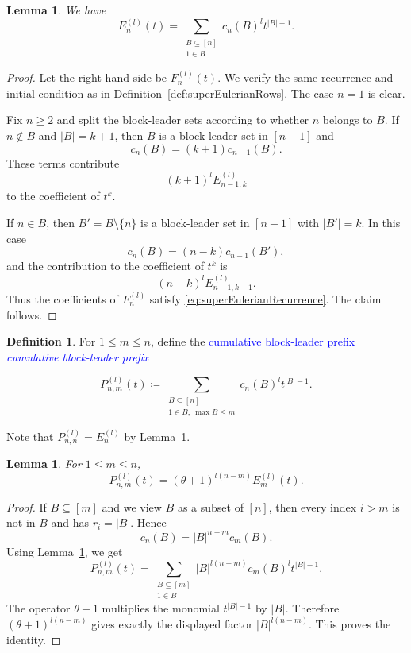 \documentclass[reqno]{amsart}
\numberwithin{equation}{section}
\newtheorem{lemma}[theorem]{Lemma}
\theoremstyle{definition}
\newtheorem{definition}[theorem]{Definition}
\newcommand{\defin}[1]{%
\relax\ifmmode%
\textcolor{blue}{#1}%
\else\textcolor{blue}{\emph{#1}}%
\fi%
}
\begin{document}
\begin{lemma}
\label{lem:blockLeaderFormula}
We have
\[
  E_n^{(l)}(t)
  =
  \sum_{\substack{B\subseteq[n]\\1\in B}}
  c_n(B)^l t^{|B|-1}.
\]
\end{lemma}

\begin{proof}
Let the right-hand side be $F_n^{(l)}(t)$.  We verify the same recurrence and
initial condition as in Definition~\ref{def:superEulerianRows}.  The case
$n=1$ is clear.

Fix $n\geq 2$ and split the block-leader sets according to whether $n$ belongs
to $B$.  If $n\notin B$ and $|B|=k+1$, then $B$ is a block-leader set in
$[n-1]$ and
\[
  c_n(B)=(k+1)c_{n-1}(B).
\]
These terms contribute
\[
  (k+1)^l E_{n-1,k}^{(l)}
\]
to the coefficient of $t^k$.

If $n\in B$, then $B'=B\setminus\{n\}$ is a block-leader set in $[n-1]$ with
$|B'|=k$.  In this case
\[
  c_n(B)=(n-k)c_{n-1}(B'),
\]
and the contribution to the coefficient of $t^k$ is
\[
  (n-k)^lE_{n-1,k-1}^{(l)}.
\]
Thus the coefficients of $F_n^{(l)}$ satisfy
\eqref{eq:superEulerianRecurrence}.  The claim follows.
\end{proof}

\begin{definition}
\label{def:prefixes}
For $1\leq m\leq n$, define the \defin{cumulative block-leader prefix}
\[
  P_{n,m}^{(l)}(t)
  \coloneqq
  \sum_{\substack{B\subseteq[n]\\1\in B,\ \max B\leq m}}
  c_n(B)^l t^{|B|-1}.
\]
\end{definition}

Note that $P_{n,n}^{(l)}=E_n^{(l)}$ by Lemma~\ref{lem:blockLeaderFormula}.

\begin{lemma}
\label{lem:prefixClosedForm}
For $1\leq m\leq n$,
\[
  P_{n,m}^{(l)}(t)
  =
  (\theta+1)^{l(n-m)}E_m^{(l)}(t).
\]
\end{lemma}

\begin{proof}
If $B\subseteq[m]$ and we view $B$ as a subset of $[n]$, then every index
$i>m$ is not in $B$ and has $r_i=|B|$.  Hence
\[
  c_n(B)=|B|^{n-m}c_m(B).
\]
Using Lemma~\ref{lem:blockLeaderFormula}, we get
\[
  P_{n,m}^{(l)}(t)
  =
  \sum_{\substack{B\subseteq[m]\\1\in B}}
  |B|^{l(n-m)}c_m(B)^l t^{|B|-1}.
\]
The operator $\theta+1$ multiplies the monomial $t^{|B|-1}$ by $|B|$.
Therefore $(\theta+1)^{l(n-m)}$ gives exactly the displayed factor
$|B|^{l(n-m)}$.  This proves the identity.
\end{proof}
\end{document}
